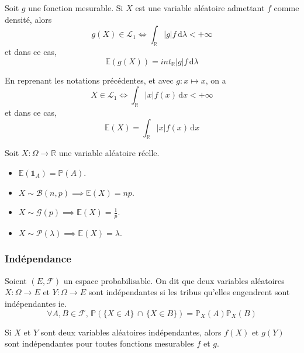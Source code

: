 	\begin{corollary}
		Soit $g$ une fonction mesurable. Si $X$ est une variable aléatoire admettant $f$ comme densité, alors
		\[ g(X) \in \mathcal{L}_1 \iff \int_{\mathbb{R}} \vert g \vert f \, \mathrm{d}\lambda < +\infty \]
		et dans ce cas,
		\[ \mathbb{E}(g(X)) = int_{\mathbb{R}} \vert g \vert f \, \mathrm{d}\lambda \]
	\end{corollary}

	\begin{remark}
		En reprenant les notations précédentes, et avec $g : x \mapsto x$, on a
		\[ X \in \mathcal{L}_1 \iff \int_{\mathbb{R}} \vert x \vert f(x) \, \mathrm{d}x < +\infty \]
		et dans ce cas,
		\[ \mathbb{E}(X) = \int_{\mathbb{R}} \vert x \vert f(x) \, \mathrm{d}x \]
	\end{remark}


	\begin{example}
		Soit $X : \Omega \rightarrow \mathbb{R}$ une variable aléatoire réelle.
		\begin{itemize}
			\item $\mathbb{E}(\mathbb{1}_A) = \mathbb{P}(A)$.
			\item $X \sim \mathcal{B}(n, p) \implies \mathbb{E}(X) = np$.
			\item $X \sim \mathcal{G}(p) \implies \mathbb{E}(X) = \frac{1}{p}$.
			\item $X \sim \mathcal{P}(\lambda) \implies \mathbb{E}(X) = \lambda$.
		\end{itemize}
	\end{example}

	\subsubsection{Indépendance}


	\begin{definition}
		Soient $(E, \mathcal{F})$ un espace probabilisable. On dit que deux variables aléatoires $X : \Omega \rightarrow E$ et $Y : \Omega \rightarrow E$ sont indépendantes si les tribus qu'elles engendrent sont indépendantes ie.
		\[ \forall A, B \in \mathcal{F}, \, \mathbb{P}(\{ X \in A \} \, \cap \, \{ X \in B \}) = \mathbb{P}_X(A) \mathbb{P}_X(B) \]
	\end{definition}

	\begin{proposition}
		Si $X$ et $Y$ sont deux variables aléatoires indépendantes, alors $f(X)$ et $g(Y)$ sont indépendantes pour toutes fonctions mesurables $f$ et $g$.
	\end{proposition}

